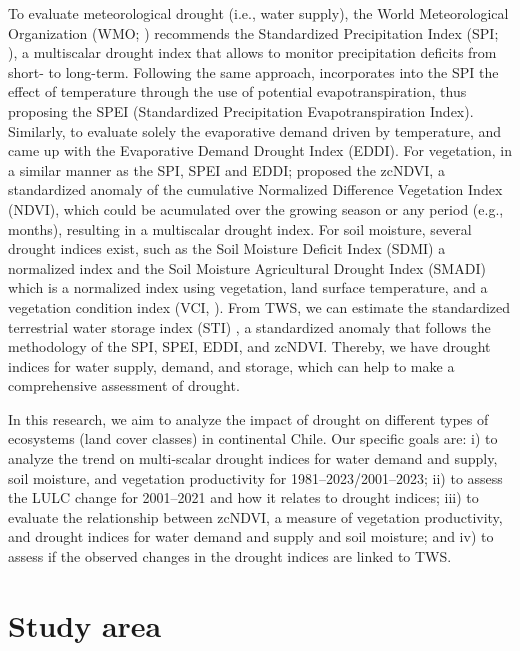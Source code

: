 \documentclass[
  authoryear,
  preprint,
  3p,
  onecolumn]{elsarticle}
\begin{document}
To evaluate meteorological drought (i.e., water supply), the World
Meteorological Organization (WMO; \citet{WMO2012}) recommends the
Standardized Precipitation Index (SPI; \citet{Mckee1993}), a multiscalar
drought index that allows to monitor precipitation deficits from short-
to long-term. Following the same approach, \citet{Vicente-Serrano2010}
incorporates into the SPI the effect of temperature through the use of
potential evapotranspiration, thus proposing the SPEI (Standardized
Precipitation Evapotranspiration Index). Similarly, to evaluate solely
the evaporative demand driven by temperature, \citet{Hobbins2016} and
\citet{McEvoy2016} came up with the Evaporative Demand Drought Index
(EDDI). For vegetation, in a similar manner as the SPI, SPEI and EDDI;
\citet{Zambrano2018} proposed the zcNDVI, a standardized anomaly of the
cumulative Normalized Difference Vegetation Index (NDVI), which could be
acumulated over the growing season or any period (e.g., months),
resulting in a multiscalar drought index. For soil moisture, several
drought indices exist, such as the Soil Moisture Deficit Index (SDMI) a
normalized index \citep{Narasimhan2005} and the Soil Moisture
Agricultural Drought Index (SMADI) \citep{Souza2021} which is a
normalized index using vegetation, land surface temperature, and a
vegetation condition index (VCI, \citep{Kogan1995}). From TWS, we can
estimate the standardized terrestrial water storage index (STI)
\citep{Cui2021}, a standardized anomaly that follows the methodology of
the SPI, SPEI, EDDI, and zcNDVI. Thereby, we have drought indices for
water supply, demand, and storage, which can help to make a
comprehensive assessment of drought.

In this research, we aim to analyze the impact of drought on different
types of ecosystems (land cover classes) in continental Chile. Our
specific goals are: i) to analyze the trend on multi-scalar drought
indices for water demand and supply, soil moisture, and vegetation
productivity for 1981--2023/2001--2023; ii) to assess the LULC change
for 2001--2021 and how it relates to drought indices; iii) to evaluate
the relationship between zcNDVI, a measure of vegetation productivity,
and drought indices for water demand and supply and soil moisture; and
iv) to assess if the observed changes in the drought indices are linked
to TWS.

\hypertarget{study-area}{%
\section{Study area}\label{study-area}}
\end{document}
